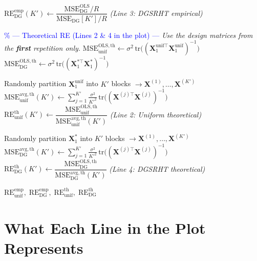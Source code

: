\documentclass[11pt,a4paper]{article}
\newcommand{\bX}{\mathbf{X}}
\newcommand{\RE}{\mathrm{RE}}
\newcommand{\MSE}{\mathrm{MSE}}
\newcommand{\tr}{\mathrm{tr}}
\newcommand{\OLS}{\mathrm{OLS}}
\begin{document}
\begin{algorithm}[H]
\begin{algorithmic}[1]
  \Statex
  \State $\RE^{\mathrm{emp}}_{\mathrm{DG}}(K') \gets \dfrac{\MSE^{\OLS}_{\mathrm{DG}} / R}{\MSE_{\mathrm{DG}}[K'] / R}$
  \qquad\emph{(Line 3: DGSRHT empirical)}
\EndFor

\Statex
\Statex \textcolor{blue}{\% --- Theoretical RE (Lines 2 \& 4 in the plot) ---}
\Statex \emph{Use the design matrices from the \textbf{first} repetition only.}
\State $\MSE^{\OLS,\mathrm{th}}_{\mathrm{unif}} \gets \sigma^2\,\tr\!\bigl((\bX^{\mathrm{unif}\top}_1 \bX^{\mathrm{unif}}_1)^{-1}\bigr)$
\State $\MSE^{\OLS,\mathrm{th}}_{\mathrm{DG}} \gets \sigma^2\,\tr\!\bigl((\bX^{*\top}_1 \bX^{*}_1)^{-1}\bigr)$

  \State Randomly partition $\bX^{\mathrm{unif}}_1$ into $K'$ blocks $\to \bX^{(1)}, \dots, \bX^{(K')}$
  \State $\MSE^{\mathrm{avg,th}}_{\mathrm{unif}}(K') \gets \displaystyle\sum_{j=1}^{K'} \frac{\sigma^2}{K'^2}\,\tr\!\bigl((\bX^{(j)\top}\bX^{(j)})^{-1}\bigr)$
  \State $\RE^{\mathrm{th}}_{\mathrm{unif}}(K') \gets \dfrac{\MSE^{\OLS,\mathrm{th}}_{\mathrm{unif}}}{\MSE^{\mathrm{avg,th}}_{\mathrm{unif}}(K')}$
  \qquad\emph{(Line 2: Uniform theoretical)}

  \Statex
  \State Randomly partition $\bX^{*}_1$ into $K'$ blocks $\to \bX^{(1)}, \dots, \bX^{(K')}$
  \State $\MSE^{\mathrm{avg,th}}_{\mathrm{DG}}(K') \gets \displaystyle\sum_{j=1}^{K'} \frac{\sigma^2}{K'^2}\,\tr\!\bigl((\bX^{(j)\top}\bX^{(j)})^{-1}\bigr)$
  \State $\RE^{\mathrm{th}}_{\mathrm{DG}}(K') \gets \dfrac{\MSE^{\OLS,\mathrm{th}}_{\mathrm{DG}}}{\MSE^{\mathrm{avg,th}}_{\mathrm{DG}}(K')}$
  \qquad\emph{(Line 4: DGSRHT theoretical)}
\EndFor

\Statex
\State \Return $\RE^{\mathrm{emp}}_{\mathrm{unif}},\; \RE^{\mathrm{emp}}_{\mathrm{DG}},\; \RE^{\mathrm{th}}_{\mathrm{unif}},\; \RE^{\mathrm{th}}_{\mathrm{DG}}$

\end{algorithmic}
\end{algorithm}

\section{What Each Line in the Plot Represents}
\end{document}
